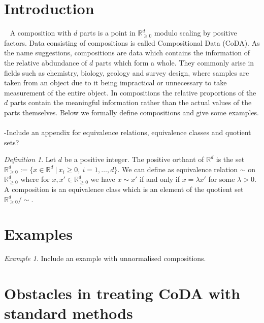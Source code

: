 \documentclass[BSc]{usydthesis}
\numberwithin{equation}{chapter}
\theoremstyle{remark}
\newtheorem{Definition}[equation]{Definition}
\newtheorem{Example}[equation]{Example}
\begin{document}
\section{Introduction}
\
\newline
A composition with $d$ parts is a point in $\mathbb{R}^d_{\geq 0}$ modulo scaling by positive factors. Data consisting of compositions is called Compositional Data (CoDA). As the name suggestions, compositions are data which contains the information of the relative abdundance of $d$ parts which form a whole. They commonly arise in fields such as chemistry, biology, geology and survey design, where samples are taken from an object due to it being impractical or unnecessary to take measurement of the entire object. In compositions the relative proportions of the $d$ parts contain the meaningful information rather than the actual values of the parts themselves. Below we formally define compositions and give some examples. \
\\
-Include an appendix for equivalence relations, equivalence classes and quotient sets?

\begin{Definition}
Let $d$ be a positive integer. The positive orthant of $\mathbb{R}^d$ is the set $\mathbb{R}^d_{\geq 0 } := \{ x \in \mathbb{R}^d \ | \ x_i \geq 0, \ i=1,\ldots, d\}.$ We can define as equivalence relation $\sim$ on $\mathbb{R}^d_{\geq 0}$ where for $x, x' \in \mathbb{R}^d_{\geq 0}$ we have $x \sim x'$ if and only if $x = \lambda x'$ for some $\lambda > 0.$ A composition is an equivalence class which is an element of the quotient set $\mathbb{R}^d_{\geq 0}/\sim. $  
\end{Definition}

\section{Examples}

\begin{Example}
Include an example with unnormalised compositions. 
\end{Example}

\section{Obstacles in treating CoDA with standard methods}
\end{document}
